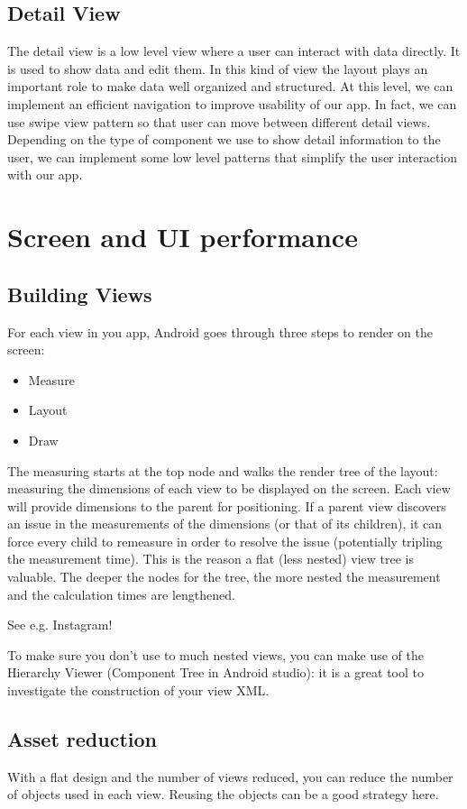 \subsection{Detail View}
The detail view is a low level view where a user can interact with data directly. It is used to show data and edit them. In this
kind of view the layout plays an important role to make data well organized and structured. At this level, we can implement
an efficient navigation to improve usability of our app. In fact, we can use swipe view pattern so that user can move between
different detail views. Depending on the type of component we use to show detail information to the user, we can implement
some low level patterns that simplify the user interaction with our app.


\section{Screen and UI performance}
\subsection{Building Views}
For each view in you app, Android goes through three steps to render on the screen:
\begin{itemize}
	\item Measure 
	\item Layout
	\item Draw
\end{itemize}

The measuring starts at the top node and walks the render tree of the layout: measuring the dimensions of each view to be displayed on the screen. Each view will provide dimensions to the parent for positioning. If a parent view discovers an issue in the measurements of the dimensions (or that of its children), it can force every child to remeasure in order to resolve the issue (potentially tripling the measurement time). This is the reason a flat (less nested) view tree is valuable. The deeper the nodes for the tree, the more nested the measurement and the calculation times are lengthened.

See e.g. Instagram! \cite{Kieft2014}


To make sure you don't use to much nested views, you can make use of the Hierarchy Viewer (Component Tree in Android studio): it is a great tool to investigate the construction of your view XML. 

\subsection{Asset reduction}
With a flat design and the number of views reduced, you can reduce the number of objects used in each view. Reusing the objects can be a good strategy here.

